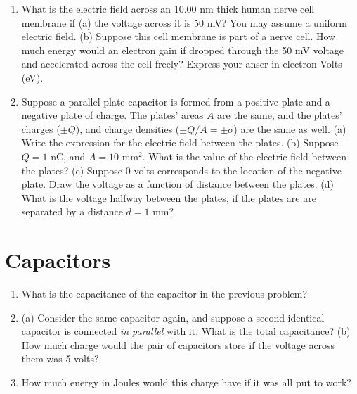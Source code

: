\documentclass[10pt]{article}
\begin{document}
\begin{enumerate}
\item What is the electric field across an 10.00 nm thick human nerve cell membrane if (a) the voltage across it is 50 mV? You may assume a uniform electric field. (b) Suppose this cell membrane is part of a nerve cell.  How much energy would an electron gain if dropped through the 50 mV voltage and accelerated across the cell freely?  Express your anser in electron-Volts (eV). \\ \vspace{2cm}
\item Suppose a parallel plate capacitor is formed from a positive plate and a negative plate of charge.  The plates' areas $A$ are the same, and the plates' charges ($\pm Q$), and charge densities ($\pm Q/A = \pm \sigma$) are the same as well. (a) Write the expression for the electric field between the plates. (b) Suppose $Q = 1$ nC, and $A = 10$ mm$^2$.  What is the value of the electric field between the plates?  (c) Suppose 0 volts corresponds to the location of the negative plate.  Draw the voltage as a function of distance between the plates.  (d) What is the voltage halfway between the plates, if the plates are are separated by a distance $d = 1$ mm? \\ \vspace{2cm}
\end{enumerate}

\section{Capacitors}

\begin{enumerate}
\item What is the capacitance of the capacitor in the previous problem? \\ \vspace{1cm}
\item (a) Consider the same capacitor again, and suppose a second identical capacitor is connected \textit{in parallel} with it.  What is the total capacitance? (b) How much charge would the pair of capacitors store if the voltage across them was 5 volts? \\ \vspace{1.5cm}
\item How much energy in Joules would this charge have if it was all put to work? \\ \vspace{1cm}
\end{enumerate}
\end{document}
